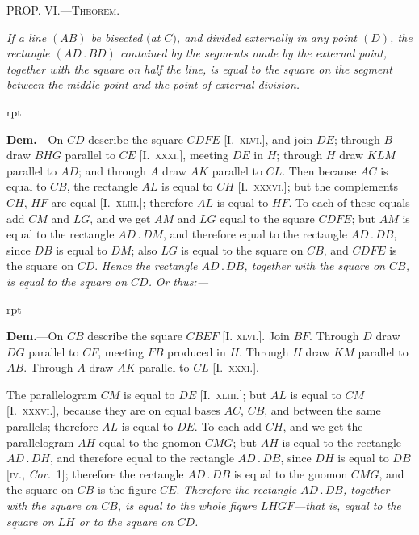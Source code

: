 \documentclass[oneside]{book}
\newcommand\mypropl[2]{
\bigskip\Needspace*{4\baselineskip}\begin{center}\textsc{#1}\end{center}
\hspace{\parindent}\emph{#2}\par\medskip
}
\newcommand\imgflow[3]{
\setcounter{wrapwidth}{#1}
\begin{wrapfigure}[#2]{r}{\value{wrapwidth}pt}
\begin{center}
\vspace{-0.3in}
\end{center}
\end{wrapfigure}
}
\begin{document}
\mypropl{PROP\@. VI\@.---Theorem.}{If a line $(AB)$ be bisected $($at $C)$, and divided externally
in any point $(D)$, the rectangle $(AD\,.\,BD)$ contained
by the segments made by the external point, together with
the square on half the line, is equal to the square on the
segment between the middle point and the point of external
division.}

\imgflow{150}{9}{f085}

\textbf{Dem.}---On $CD$ describe the square $CDFE$ [I.~\textsc{xlvi}.],
and join $DE$; through $B$
draw $BHG$ parallel to $CE$
[I.~\textsc{xxxi}.], meeting $DE$ in
$H$; through $H$ draw $KLM$
parallel to $AD$; and through
$A$ draw $AK$ parallel to $CL$.
Then because $AC$ is equal to
$CB$, the rectangle $AL$ is equal
to $CH$ [I.~\textsc{xxxvi}.]; but the complements $CH$, $HF$ are
equal [I.~\textsc{xliii}.]; therefore $AL$ is equal to $HF$. To
each of these equals add $CM$ and $LG$, and we get $AM$
and $LG$ equal to the square $CDFE$; but $AM$ is equal to
the rectangle $AD\,.\,DM$, and therefore equal to the
rectangle $AD\,.\,DB$, since $DB$ is equal to $DM$; also $LG$
is equal to the square on $CB$, and $CDFE$ is the square
on $CD$. \textit{Hence the rectangle $AD\,.\,DB$, together with the
square on $CB$, is equal to the square on $CD$.} 
\textit{Or thus:---}\par\medskip

\imgflow{140}{9}{f086}

\textbf{Dem.}---On $CB$ describe the square $CBEF$ [I. \textsc{xlvi}.].\label{Ixlvi}
Join $BF$. Through $D$ draw
$DG$ parallel to $CF$, meeting
$FB$ produced in $H$. Through
$H$ draw $KM$ parallel to $AB$.
Through $A$ draw $AK$ parallel to $CL$ [I.~\textsc{xxxi}.].

The parallelogram $CM$ is
equal to $DE$ [I.~\textsc{xliii}.]; but
$AL$ is equal to $CM$ [I.~\textsc{xxxvi}.],
because they are on equal bases $AC$, $CB$, and between
the same parallels; therefore $AL$ is equal to $DE$. To
each add $CH$, and we get the parallelogram $AH$ equal
to the gnomon $CMG$; but $AH$ is equal to the rectangle
$AD\,.\,DH$, and therefore equal to the rectangle $AD\,.\,DB$,
since $DH$ is equal to $DB$ [\textsc{iv.}, \textit{Cor.}~1]; therefore the
rectangle $AD\,.\,DB$ is equal to the gnomon $CMG$, and
the square on $CB$ is the figure $CE$. \textit{Therefore the rectangle
$AD\,.\,DB$, together with the square on $CB$, is equal
to the whole figure $LHGF$---that is, equal to the square
on $LH$ or to the square on $CD$.}
\end{document}
